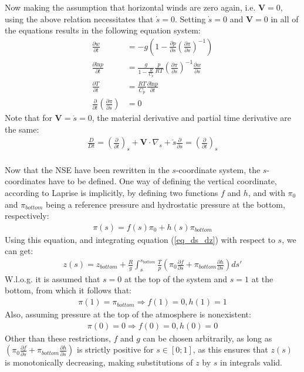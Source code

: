 Now making the assumption that horizontal winds are zero again, i.e. $\textbf{V}=0$, using the above relation necessitates that $\dot{s}=0$.
Setting $\dot{s}=0$ and $\textbf{V}=0$ in all of the equations results in the following equation system:
\begin{align*}
\frac{\partial w}{\partial t} &= -g\left(1 - \frac{\partial p}{\partial s}\left(\frac{\partial \pi}{\partial s}\right)^{-1}\right) \\
\frac{\partial \text{ln}p}{\partial t} &= \frac{g}{1- \frac{R}{C_p}} \frac{p}{RT}\left(\frac{\partial \pi}{\partial s}\right)^{-1} \frac{\partial w}{\partial s}\\
\frac{\partial T}{\partial t} &= \frac{RT}{C_p}\frac{\partial \text{ln}p}{\partial t}\\
\frac{\partial}{\partial t}\left(\frac{\partial \pi}{\partial s}\right) &= 0
\end{align*}
Note that for $\textbf{V}=\dot{s}=0$, the material derivative and partial time derivative are the same:
\begin{align*}
\frac{D}{Dt} = \left(\frac{\partial}{\partial t}\right)_s + \textbf{V} \cdot \nabla _s + \dot{s}\frac{\partial }{\partial s} = \left(\frac{\partial}{\partial t}\right)_s
\end{align*}
\\
Now that the NSE have been rewritten in the $s$-coordinate system, the $s$-coordinates have to be defined.
One way of defining the vertical coordinate, according to Laprise \cite{laprise1992euler} is implicitly, by defining two functions $f$ and $h$, and with $\pi_0$ and $\pi _{bottom}$ being a reference pressure and hydrostatic pressure at the bottom, respectively:
\begin{align*}
\pi (s) = f(s)\pi_0 + h(s)\pi_{bottom}
\end{align*}
Using this equation, and integrating equation (\ref{eq_ds_dz}) with respect to $s$, we can get:
\begin{align*}
z(s) = z_{bottom} + \frac{R}{g}\int _s ^{s_{bottom}} \frac{T}{p}\left(\pi_0 \frac{\partial f}{\partial s} + \pi_{bottom} \frac{\partial h}{\partial s}\right)ds'
\end{align*}
W.l.o.g. it is assumed that $s=0$ at the top of the system and $s=1$ at the bottom, from which it follows that:
\begin{align*}
\pi(1) = \pi_{bottom} \Rightarrow f(1) = 0 , h(1) = 1
\end{align*}
Also, assuming pressure at the top of the atmosphere is nonexistent:
\begin{align*}
\pi(0) = 0 \Rightarrow f(0) = 0, h(0) = 0
\end{align*}
Other than these restrictions, $f$ and $g$ can be chosen arbitrarily, as long as $\left(\pi_0 \frac{\partial f}{\partial s} + \pi_{bottom} \frac{\partial h}{\partial s}\right)$ is strictly positive for $s\in[0;1]$, as this ensures that $z(s)$ is monotonically decreasing, making substitutions of $z$ by $s$ in integrals valid.

